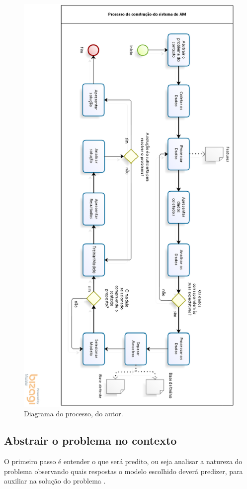 \begin{figure}[h]
	\centering
	\includegraphics[width=1\textwidth]{figuras/ProcessoAM.eps}
	\caption{Diagrama do processo, do autor.}
	\label{ProcessoAM}
\end{figure}

\subsection{Abstrair o problema no contexto}
O primeiro passo é entender o que será predito, ou seja analisar a natureza do problema observando quais respostas o modelo escolhido deverá predizer, para auxiliar na solução do problema \cite{geron2017hands}.

